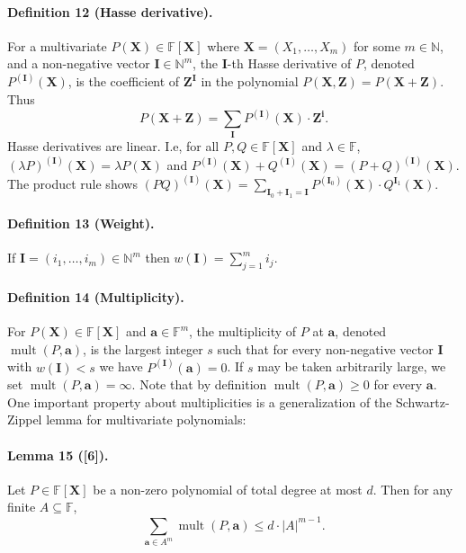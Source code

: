 \paragraph{Definition 12 (Hasse derivative).} For a multivariate $P(\boldsymbol X)\in\mathbb F[\boldsymbol X]$ where $\boldsymbol X=(X_1,\ldots,X_m)$ for some $m\in\mathbb N$, and a non-negative vector $\boldsymbol I\in\mathbb N^m$, the $\boldsymbol I$-th Hasse derivative of $P$, denoted $P^{(\boldsymbol I)}(\boldsymbol X)$, is the coefficient of $\boldsymbol Z^{\boldsymbol I}$ in the polynomial $P(\boldsymbol X,\boldsymbol Z)=P(\boldsymbol X+\boldsymbol Z)$. Thus
\[P(\boldsymbol X+\boldsymbol Z)=\sum_{\boldsymbol I}P^{(\boldsymbol I)}(\boldsymbol X)\cdot\boldsymbol Z^{\boldsymbol i}.\]
Hasse derivatives are linear. I.e, for all $P,Q\in\mathbb F[\boldsymbol X]$ and $\lambda\in\mathbb F$, $(\lambda P)^{(\boldsymbol I)}(\boldsymbol X)=\lambda P(\boldsymbol X)$ and $P^{(\boldsymbol I)}(\boldsymbol X)+Q^{(\boldsymbol I)}(\boldsymbol X)=(P+Q)^{(\boldsymbol I)}(\boldsymbol X)$. The product rule shows $(PQ)^{(\boldsymbol I)}(\boldsymbol X)=\sum_{\boldsymbol I_0+\boldsymbol I_1=\boldsymbol I}P^{(\boldsymbol I_0)}(\boldsymbol X)\cdot Q^{\boldsymbol I_1}(\boldsymbol X)$.
\paragraph{Definition 13 (Weight).} If $\boldsymbol I=(i_1,\ldots,i_m)\in\mathbb N^m$ then $w(\boldsymbol I)=\sum_{j=1}^mi_j$.
\paragraph{Definition 14 (Multiplicity).} For $P(\boldsymbol X)\in\mathbb F[\boldsymbol X]$ and $\boldsymbol a\in\mathbb F^m$, the multiplicity of $P$ at $\boldsymbol a$, denoted $\operatorname{mult}(P,\boldsymbol a)$, is the largest integer $s$ such that for every non-negative vector $\boldsymbol I$ with $w(\boldsymbol I)<s$ we have $P^{(\boldsymbol I)}(\boldsymbol a)=0$. If $s$ may be taken arbitrarily large, we set $\operatorname{mult}(P,\boldsymbol a)=\infty$.
Note that by definition $\operatorname{mult}(P,\boldsymbol a)\geq0$ for every $\boldsymbol a$. One important property about multiplicities is a generalization of the Schwartz-Zippel lemma for multivariate polynomials:
\paragraph{Lemma 15 ([6]).} Let $P\in\mathbb F[\boldsymbol X]$ be a non-zero polynomial of total degree at most $d$. Then for any finite $A\subseteq\mathbb F$,
\[\sum_{\boldsymbol a\in A^m}\operatorname{mult}(P,\boldsymbol a)\leq d\cdot|A|^{m-1}.\]
